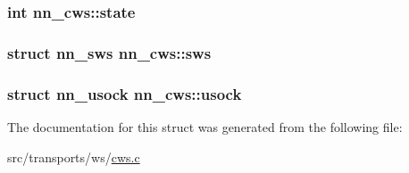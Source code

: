\subsubsection[{state}]{\setlength{\rightskip}{0pt plus 5cm}int nn\+\_\+cws\+::state}\hypertarget{structnn__cws_a95ff0b16ec166d1a8d4f3fab57d4a377}{}\label{structnn__cws_a95ff0b16ec166d1a8d4f3fab57d4a377}
\subsubsection[{sws}]{\setlength{\rightskip}{0pt plus 5cm}struct {\bf nn\+\_\+sws} nn\+\_\+cws\+::sws}\hypertarget{structnn__cws_a21c4c5f3afc0ac138b98bb1873457e6f}{}\label{structnn__cws_a21c4c5f3afc0ac138b98bb1873457e6f}
\subsubsection[{usock}]{\setlength{\rightskip}{0pt plus 5cm}struct {\bf nn\+\_\+usock} nn\+\_\+cws\+::usock}\hypertarget{structnn__cws_afc94a8982678a15880a4e997e5ce7ee4}{}\label{structnn__cws_afc94a8982678a15880a4e997e5ce7ee4}


The documentation for this struct was generated from the following file\+:\begin{DoxyCompactItemize}
\item 
src/transports/ws/\hyperlink{cws_8c}{cws.\+c}\end{DoxyCompactItemize}
